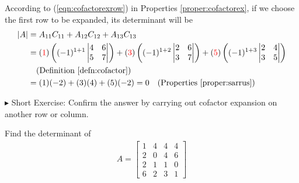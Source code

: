 \begin{solution}
According to (\ref{eqn:cofactorexrow}) in Properties \ref{proper:cofactorex}, if we choose the first row to be expanded, its determinant will be
\begin{align*}
|A| &= A_{11}C_{11} + A_{12}C_{12} + A_{13}C_{13} \\
&= (\textcolor{red}{1})\left((-1)^{1+1}
\begin{vmatrix}
4 & 6 \\
5 & 7
\end{vmatrix}\right)
+
(\textcolor{red}{3})\left((-1)^{1+2}
\begin{vmatrix}
2 & 6 \\
3 & 7
\end{vmatrix}\right) + 
(\textcolor{red}{5})\left((-1)^{1+3}
\begin{vmatrix}
2 & 4 \\
3 & 5
\end{vmatrix}\right) \\
&\quad \text{(Definition \ref{defn:cofactor})}\\
&= (1)(-2) + (3)(4) + (5)(-2) = 0 \quad \text{(Properties \ref{proper:sarrus})} 
\end{align*}
\end{solution}
$\blacktriangleright$ Short Exercise: Confirm the answer by carrying out cofactor expansion on another row or column.\footnotemark
\begin{exmp}
\label{exmp:4x4det}
Find the determinant of
\begin{align*}
A = 
\begin{bmatrix}
1 & 4 & 4 & 4 \\
2 & 0 & 4 & 6 \\
2 & 1 & 1 & 0 \\
6 & 2 & 3 & 1
\end{bmatrix}
\end{align*}\
\end{exmp}

